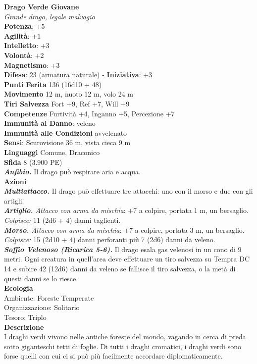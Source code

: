 \begin{multicols}{2}
\medskip\textbf{Drago Verde Giovane}\\
\emph{Grande drago, legale malvagio}\\
\textbf{Potenza}: +5\\
\textbf{Agilità}: +1\\
\textbf{Intelletto}: +3\\
\textbf{Volontà}: +2\\
\textbf{Magnetismo}: +3\\
\textbf{Difesa}: 23 (armatura naturale) - \textbf{Iniziativa}: +3\\
\textbf{Punti Ferita} 136 (16d10 + 48)\\
\textbf{Movimento} 12 m, nuoto 12 m, volo 24 m\\
\textbf{Tiri Salvezza} Fort +9, Ref +7, Will +9\\
\textbf{Competenze} Furtività +4, Inganno +5, Percezione +7\\
\textbf{Immunità al Danno}: veleno\\
\textbf{Immunità alle Condizioni} avvelenato\\
\textbf{Sensi}: Scurovisione 36 m, vista cieca 9 m \\
\textbf{Linguaggi} Comune, Draconico\\
\textbf{Sfida} 8 (3.900 PE)\smallskip\\
\emph{\textbf{Anfibio.}} Il drago può respirare aria e acqua. \\
\smallskip\textbf{Azioni}\\
\emph{\textbf{Multiattacco.}} Il drago può effettuare tre attacchi: uno con il morso e due con gli artigli.\\
\emph{\textbf{Artiglio.} Attacco con arma da mischia}: +7 a colpire, portata 1 m, un bersaglio.\\
\emph{Colpisce:} 11 (2d6 + 4) danni taglienti.\\
\emph{\textbf{Morso.} Attacco con arma da mischia}: +7 a colpire, portata 3 m, un bersaglio.\\
\emph{Colpisce:} 15 (2d10 + 4) danni perforanti più 7 (2d6) danni da veleno.\\
\emph{\textbf{Soffio Velenoso (Ricarica 5-6).}} Il drago esala gas velenosi in un cono di 9 metri. Ogni creatura in quell'area deve effettuare un tiro salvezza su Tempra DC 14 e subire 42 (12d6) danni da veleno se fallisce il tiro salvezza, o la metà di questi danni se lo riesce.\\
\textbf{Ecologia}\\
Ambiente: Foreste Temperate\\
Organizzazione: Solitario\\
Tesoro: Triplo\\
\textbf{Descrizione}\\
I draghi verdi vivono nelle antiche foreste del mondo, vagando in cerca di preda sotto giganteschi tetti di foglie. Di tutti i draghi cromatici, i draghi verdi sono forse quelli con cui ci si può più facilmente accordare diplomaticamente.\\


\end{multicols}
